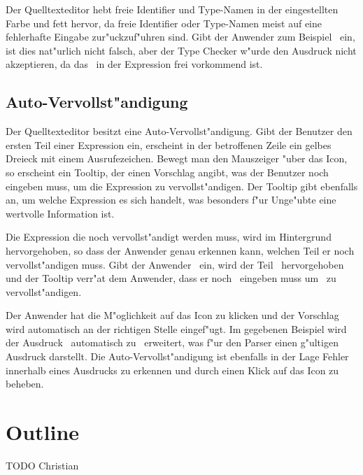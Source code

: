 Der Quelltexteditor hebt freie Identifier und Type-Namen in der eingestellten
Farbe und fett hervor, da freie Identifier oder Type-Namen meist auf eine
fehlerhafte Eingabe zur"uckzuf"uhren sind. Gibt der Anwender zum Beispiel
\grqq\ ein, ist dies nat"urlich nicht falsch, aber
der Type Checker w"urde den Ausdruck nicht akzeptieren, da das \grqq\ 
in der Expression frei vorkommend ist.

\subsection{Auto-Vervollst"andigung}
\label{Auto-Vervollstaendigung}
Der Quelltexteditor besitzt eine Auto-Vervollst"andigung. Gibt der Benutzer
den ersten Teil einer Expression ein, erscheint in der betroffenen Zeile ein
gelbes Dreieck mit einem Ausrufezeichen. Bewegt man den Mauszeiger "uber
das Icon, so erscheint ein Tooltip, der einen Vorschlag angibt, was der
Benutzer noch eingeben muss, um die Expression zu vervollst"andigen. Der
Tooltip gibt ebenfalls an, um welche Expression es sich handelt, was
besonders f"ur Unge"ubte eine wertvolle Information ist.

Die Expression die noch vervollst"andigt werden muss, wird im Hintergrund
hervorgehoben, so dass der Anwender genau erkennen kann, welchen Teil er
noch vervollst"andigen muss. Gibt der Anwender \glqq{\bf 1 + let x =}\grqq\ 
ein, wird der Teil \grqq\ hervorgehoben und der Tooltip
verr"at dem Anwender, dass er noch \glqq{\bf e1 in e2}\grqq\ eingeben muss
um \glqq{\bf Let}\grqq\ zu vervollst"andigen.

Der Anwender hat die M"oglichkeit auf das Icon zu klicken und der Vorschlag
wird automatisch an der richtigen Stelle eingef"ugt. Im gegebenen Beispiel
wird der Ausdruck \glqq{\bf 1 + let x =}\grqq\ automatisch zu
\glqq{\bf 1 + let x = e1 in e2}\grqq\ erweitert, was f"ur den Parser einen
g"ultigen Ausdruck darstellt. Die Auto-Vervollst"andigung ist ebenfalls in
der Lage Fehler innerhalb eines Ausdrucks zu erkennen und durch einen Klick
auf das Icon zu beheben.


\section {Outline}
\label{Beweiswerkzeuge}
TODO Christian







